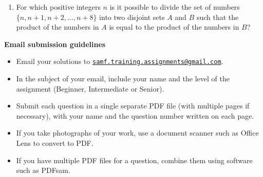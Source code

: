 \documentclass{article}
\begin{document}
\begin{enumerate}[1.]
\bigskip
\item %
For which positive integers $n$ is it possible to divide the set of numbers $\{n, n+1, n+2, \dotsc, n+8\}$ into two disjoint sets $A$ and $B$ such that the product of the numbers in $A$ is equal to the product of the numbers in $B$?

\end{enumerate}


\vfill
\textbf{\Large Email submission guidelines}
\begin{itemize}
	\item Email your solutions to \href{mailto:samf.training.assignments@gmail.com}{\texttt{samf.training.assignments@gmail.com}}.
	\item In the subject of your email, include your name and the level of the assignment (Beginner, Intermediate or Senior).
	\item Submit each question in a single separate PDF file (with multiple pages if necessary), with your name and the question number written on each page.
	\item If you take photographs of your work, use a document scanner such as Office Lens to convert to PDF.
	\item If you have multiple PDF files for a question, combine them using software such as PDFsam.
\end{itemize}
\end{document}
